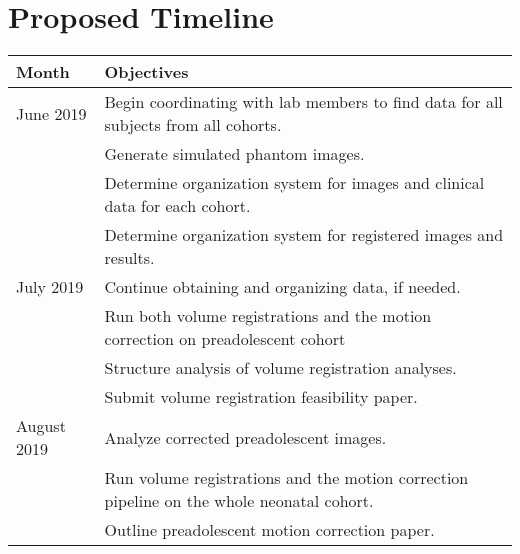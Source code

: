\chapter{Proposed Timeline}

\begin{table}[h]
\begin{tabular}{p{}|p{}}
\textbf{Month} & \multicolumn{1}{l}{\textbf{Objectives}}                                                                         \\ \hline
June 2019      & Begin coordinating with lab members to find data for all subjects from all cohorts. \\
               & Generate simulated phantom images.                                                                               \\
               & Determine organization system for images and clinical data for each cohort.                                      \\
               & Determine organization system for registered images and results.                                                 \\ \hline
July 2019      & Continue obtaining and organizing data, if needed.                                                               \\
               & Run both volume registrations and the motion correction on preadolescent cohort                                  \\
               & Structure analysis of volume registration analyses.                                                              \\
               & Submit volume registration feasibility paper.                                                                    \\ \hline
August 2019    & Analyze corrected preadolescent images.                                                                          \\
               & Run volume registrations and the motion correction pipeline on the whole neonatal cohort.                        \\
               & Outline preadolescent motion correction paper.                                                                   \\

\end{tabular}
\end{table}

